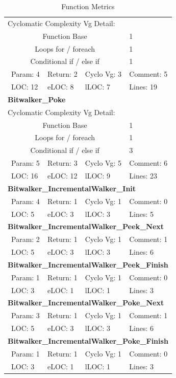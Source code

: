 \begin{longtable}{||p{}|p{}|p{}|p{}||}
  \caption{Function Metrics}\\
    \hline\hline
    \endhead
    \hline\hline
    \endfoot
\multicolumn{4}{||l||}{\textbf{Bitwalker\_Peek}}
\\\hline
\multicolumn{4}{||l||}{Cyclomatic Complexity Vg Detail:}
\\\hline
\multicolumn{3}{||c|}{Function Base} & 1
\\\hline
\multicolumn{3}{||c|}{Loops for / foreach} & 1
\\\hline
\multicolumn{3}{||c|}{Conditional if / else if} & 1
\\\hline
\ Param: 4 &
Return: 2 &
Cyclo Vg: 3 &
Comment: 5
 \\\hline
\ LOC: 12 &
eLOC: 8 &
lLOC: 7 &
Lines: 19
 \\\hline
\multicolumn{4}{||l||}{\textbf{Bitwalker\_Poke}}
\\\hline
\multicolumn{4}{||l||}{Cyclomatic Complexity Vg Detail:}
\\\hline
\multicolumn{3}{||c|}{Function Base} & 1
\\\hline
\multicolumn{3}{||c|}{Loops for / foreach} & 1
\\\hline
\multicolumn{3}{||c|}{Conditional if / else if} & 3
\\\hline
\ Param: 5 &
Return: 3 &
Cyclo Vg: 5 &
Comment: 6
 \\\hline
\ LOC: 16 &
eLOC: 12 &
lLOC: 9 &
Lines: 23
 \\\hline
\multicolumn{4}{||l||}{\textbf{Bitwalker\_IncrementalWalker\_Init}}
\\\hline
\ Param: 4 &
Return: 1 &
Cyclo Vg: 1 &
Comment: 0
 \\\hline
\ LOC: 5 &
eLOC: 3 &
lLOC: 3 &
Lines: 5
 \\\hline
\multicolumn{4}{||l||}{\textbf{Bitwalker\_IncrementalWalker\_Peek\_Next}}
\\\hline
\ Param: 2 &
Return: 1 &
Cyclo Vg: 1 &
Comment: 1
 \\\hline
\ LOC: 5 &
eLOC: 3 &
lLOC: 3 &
Lines: 6
 \\\hline
\multicolumn{4}{||l||}{\textbf{Bitwalker\_IncrementalWalker\_Peek\_Finish}}
\\\hline
\ Param: 1 &
Return: 1 &
Cyclo Vg: 1 &
Comment: 0
 \\\hline
\ LOC: 3 &
eLOC: 1 &
lLOC: 1 &
Lines: 3
 \\\hline
\multicolumn{4}{||l||}{\textbf{Bitwalker\_IncrementalWalker\_Poke\_Next}}
\\\hline
\ Param: 3 &
Return: 1 &
Cyclo Vg: 1 &
Comment: 1
 \\\hline
\ LOC: 5 &
eLOC: 3 &
lLOC: 3 &
Lines: 6
 \\\hline
\multicolumn{4}{||l||}{\textbf{Bitwalker\_IncrementalWalker\_Poke\_Finish}}
\\\hline
\ Param: 1 &
Return: 1 &
Cyclo Vg: 1 &
Comment: 0
 \\\hline
\ LOC: 3 &
eLOC: 1 &
lLOC: 1 &
Lines: 3
 \\\hline
\end{longtable}

